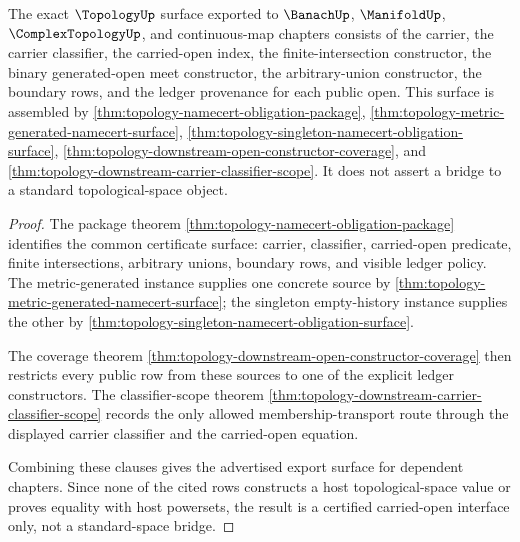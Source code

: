 \begin{theorem}
\label{thm:topology-downstream-namecert-export-surface}
The exact $\TopologyUp$ surface exported to $\BanachUp$, $\ManifoldUp$, $\ComplexTopologyUp$, and continuous-map chapters consists of the carrier, the carrier classifier, the carried-open index, the finite-intersection constructor, the binary generated-open meet constructor, the arbitrary-union constructor, the boundary rows, and the ledger provenance for each public open. This surface is assembled by \autoref{thm:topology-namecert-obligation-package}, \autoref{thm:topology-metric-generated-namecert-surface}, \autoref{thm:topology-singleton-namecert-obligation-surface}, \autoref{thm:topology-downstream-open-constructor-coverage}, and \autoref{thm:topology-downstream-carrier-classifier-scope}. It does not assert a bridge to a standard topological-space object.
\end{theorem}
\begin{proof}
The package theorem \autoref{thm:topology-namecert-obligation-package} identifies the common certificate surface: carrier, classifier, carried-open predicate, finite intersections, arbitrary unions, boundary rows, and visible ledger policy. The metric-generated instance supplies one concrete source by \autoref{thm:topology-metric-generated-namecert-surface}; the singleton empty-history instance supplies the other by \autoref{thm:topology-singleton-namecert-obligation-surface}.

The coverage theorem \autoref{thm:topology-downstream-open-constructor-coverage} then restricts every public row from these sources to one of the explicit ledger constructors. The classifier-scope theorem \autoref{thm:topology-downstream-carrier-classifier-scope} records the only allowed membership-transport route through the displayed carrier classifier and the carried-open equation.

Combining these clauses gives the advertised export surface for dependent chapters. Since none of the cited rows constructs a host topological-space value or proves equality with host powersets, the result is a certified carried-open interface only, not a standard-space bridge.
\end{proof}

